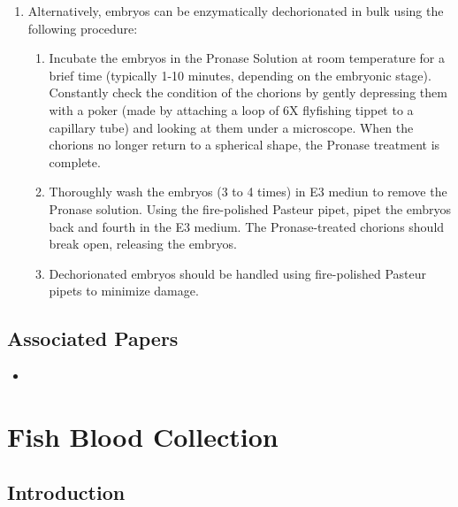 \documentclass[
  letterpaper,
  DIV=11,
  numbers=noendperiod]{scrreprt}
\providecommand{\tightlist}{%
  \setlength{\itemsep}{0pt}\setlength{\parskip}{0pt}}\usepackage{longtable,booktabs,array}
\begin{document}
\begin{enumerate}
\def\labelenumi{\arabic{enumi}.}
\setcounter{enumi}{1}
\item
  Alternatively, embryos can be enzymatically dechorionated in bulk
  using the following procedure:

  \begin{enumerate}
  \def\labelenumii{\alph{enumii}.}
  \tightlist
  \item
    Incubate the embryos in the Pronase Solution at room temperature for
    a brief time (typically 1-10 minutes, depending on the embryonic
    stage). Constantly check the condition of the chorions by gently
    depressing them with a poker (made by attaching a loop of 6X
    flyfishing tippet to a capillary tube) and looking at them under a
    microscope. When the chorions no longer return to a spherical shape,
    the Pronase treatment is complete.
  \item
    Thoroughly wash the embryos (3 to 4 times) in E3 mediun to remove
    the Pronase solution. Using the fire-polished Pasteur pipet, pipet
    the embryos back and fourth in the E3 medium. The Pronase-treated
    chorions should break open, releasing the embryos.
  \item
    Dechorionated embryos should be handled using fire-polished Pasteur
    pipets to minimize damage.
  \end{enumerate}
\end{enumerate}

\hypertarget{associated-papers-28}{%
\section{Associated Papers}\label{associated-papers-28}}

\begin{itemize}
\tightlist
\item
\end{itemize}

\hypertarget{sec-VertExperiment_blood_collection}{%
\chapter{Fish Blood
Collection}\label{sec-VertExperiment_blood_collection}}

\hypertarget{introduction-46}{%
\section{Introduction}\label{introduction-46}}
\end{document}
